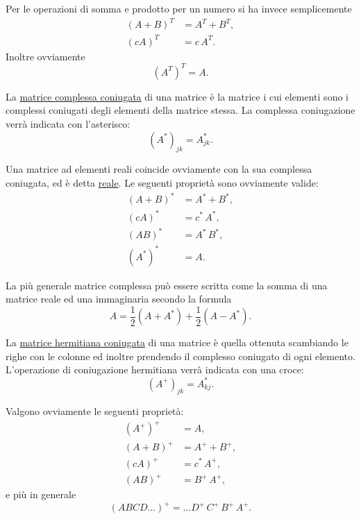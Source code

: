 \documentclass[11pt, a4paper]{book}
\numberwithin{equation}{section}
\begin{document}
Per le operazioni di somma e prodotto per un numero si ha invece semplicemente
\begin{align}
    (A + B)^T &= A^T + B^T,
    \tag{25} \\
    (cA)^T &= c\, A^T.
    \tag{26}
\end{align}
Inoltre ovviamente
\begin{equation}
    \left(A^T\right)^T = A.
    \tag{27}
\end{equation}

La \underline{matrice complessa coniugata} di una matrice è la matrice i cui elementi sono i complessi coniugati degli elementi della matrice stessa. La complessa coniugazione verrà indicata con l'asterisco:
\[
    \left(A^*\right)_{jk} = A_{jk}^*.
\]

Una matrice ad elementi reali coincide ovviamente con la sua complessa coniugata, ed è detta \underline{reale}. Le seguenti proprietà sono ovviamente valide:
\begin{align}
    (A + B)^* &= A^* + B^*,
    \tag{28} \\
    (cA)^* &= c^*\, A^*,
    \tag{29} \\
    (AB)^* &= A^*\, B^*,
    \tag{30} \\
    (A^*)^* &= A.
    \tag{31}
\end{align}

La più generale matrice complessa può essere scritta come la somma di una matrice reale ed una immaginaria secondo la formula
\[
    A = \frac{1}{2}\left(A + A^*\right) + \frac{1}{2}\left(A - A^*\right).
\]

La \underline{matrice hermitiana coniugata} di una matrice è quella ottenuta scambiando le righe con le colonne ed inoltre prendendo il complesso coniugato di ogni elemento. L'operazione di coniugazione hermitiana verrà indicata con una croce:
\begin{equation}
    \left(A^+\right)_{jk} = A_{kj}^*.
    \tag{32}
\end{equation}

Valgono ovviamente le seguenti proprietà:
\begin{align}
    \left(A^+\right)^+ &= A,
    \tag{33} \\
    (A + B)^+ &= A^+ + B^+,
    \tag{34} \\
    (cA)^+ &= c^*\, A^+,
    \tag{35} \\
    (AB)^+ &= B^+\, A^+,
    \tag{36a}
\end{align}
e più in generale
\begin{equation}
    (ABCD\ldots)^+ = \ldots D^+\, C^+\, B^+\, A^+.
    \tag{36b}
\end{equation}
\end{document}
